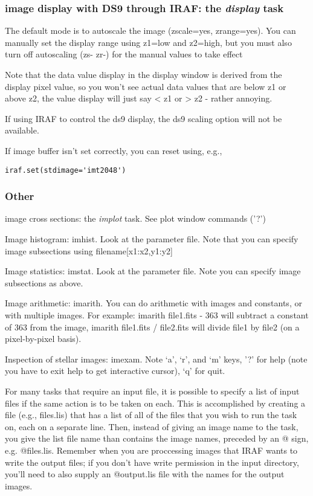 \documentclass{article}
\begin{document}
\subsubsection*{image display with DS9 through IRAF: the
\emph{display} task}

The default mode is to autoscale the image (zscale=yes, zrange=yes).
You can manually set the display range using z1=low and z2=high, but
you must also turn off autoscaling (zs- zr-) for the manual values to
take effect

Note that the data value display in the display window is derived from
the display pixel value, so you won't see actual data values that are
below z1 or above z2, the value display will just say < z1 or > z2 -
rather annoying.

If using IRAF to control the ds9 display, the ds9 scaling option will
not be available.

If image buffer isn't set correctly, you can reset using, e.g.,

\verb|iraf.set(stdimage='imt2048')|

\subsubsection*{Other}

image cross sections: the \emph{implot} task.
See plot window commands ('?')

Image histogram: imhist. Look at the parameter file. Note that you can
specify image subsections using filename[x1:x2,y1:y2]

Image statistics: imstat. Look at the parameter file. Note you can
specify image subsections as above.

Image arithmetic: imarith. You can do arithmetic with images and
constants, or with multiple images. For example: imarith file1.fits -
363 will subtract a constant of 363 from the image, imarith file1.fits
/ file2.fits will divide file1 by file2 (on a pixel-by-pixel basis).

Inspection of stellar images: imexam. Note `a', `r', and `m' keys, '?'
for help (note you have to exit help to get interactive cursor), `q'
for quit.

For many tasks that require an input file, it is possible to specify a
list of input files if the same action is to be taken on each. This is
accomplished by creating a file (e.g., files.lis) that has a list of
all of the files that you wish to run the task on, each on a separate
line. Then, instead of giving an image name to the task, you give the
list file name than contains the image names, preceded by an @ sign,
e.g. @files.lis. Remember when you are proccessing images that IRAF
wants to write the output files; if you don't have write permission in
the input directory, you'll need to also supply an @output.lis file
with the names for the output images.
\end{document}
